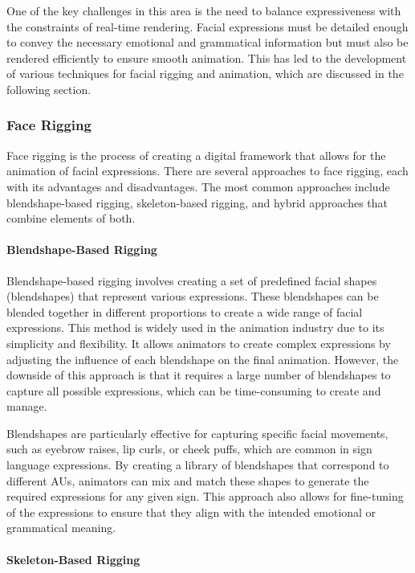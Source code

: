 \documentclass[../../main.tex]{subfiles}
\begin{document}
One of the key challenges in this area is the need to balance expressiveness with the constraints of real-time rendering. Facial expressions must be detailed enough to convey the necessary emotional and grammatical information but must also be rendered efficiently to ensure smooth animation. This has led to the development of various techniques for facial rigging and animation, which are discussed in the following section.

\subsubsection{Face Rigging}

Face rigging is the process of creating a digital framework that allows for the animation of facial expressions. There are several approaches to face rigging, each with its advantages and disadvantages. The most common approaches include blendshape-based rigging, skeleton-based rigging, and hybrid approaches that combine elements of both.

\paragraph{Blendshape-Based Rigging}

Blendshape-based rigging involves creating a set of predefined facial shapes (blendshapes) that represent various expressions. These blendshapes can be blended together in different proportions to create a wide range of facial expressions. This method is widely used in the animation industry due to its simplicity and flexibility. It allows animators to create complex expressions by adjusting the influence of each blendshape on the final animation. However, the downside of this approach is that it requires a large number of blendshapes to capture all possible expressions, which can be time-consuming to create and manage.

Blendshapes are particularly effective for capturing specific facial movements, such as eyebrow raises, lip curls, or cheek puffs, which are common in sign language expressions. By creating a library of blendshapes that correspond to different AUs, animators can mix and match these shapes to generate the required expressions for any given sign. This approach also allows for fine-tuning of the expressions to ensure that they align with the intended emotional or grammatical meaning.

\paragraph{Skeleton-Based Rigging}
\end{document}
